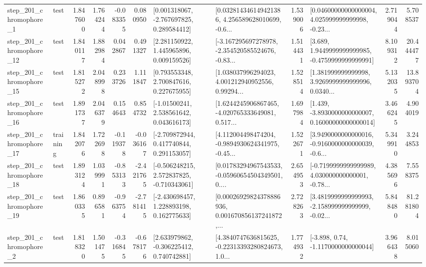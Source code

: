 \begin{tabular}{llrrrrllrlrr}
   step\_201\_chromophore\_1 &      test &      1.847600 &    1.764244 &     -0.083355 &  0.080950 &    [0.001318067, -2.767697825, 0.289584412] &  [0.032814346149421386, 4.256589628010699, -0.6... &       1.539006 &  [0.04600000000000004, 4.025999999999998, -0.23... &            2.719044 &          5.708537 \\
  step\_201\_chromophore\_12 &      test &      1.840117 &    1.882984 &      0.042867 &  0.491327 &     [2.281150922, 1.445965896, 0.009159526] &  [-3.167295697278978, -2.354520585524676, -0.83... &       1.514431 &   [3.689, 1.9449999999999985, -0.4759999999999991] &            8.109312 &         20.444477 \\
  step\_201\_chromophore\_15 &      test &      1.815272 &    2.048998 &      0.233726 &  1.111847 &     [0.793553348, 2.700847616, 0.227675955] &  [1.038037996294023, 4.001212940952556, 0.99294... &       1.528514 &  [1.381999999999998, 3.9269999999999996, 0.0340... &            5.132035 &         13.893704 \\
  step\_201\_chromophore\_16 &      test &      1.891737 &    2.046379 &      0.154643 &  0.854732 &     [-1.01500241, 2.538561642, 0.043616173] &  [1.6244245906867465, -4.020765333649081, 0.517... &       1.697984 &  [1.439, -3.8930000000000007, 0.16000000000000014] &            3.466245 &          4.904019 \\
  step\_201\_chromophore\_17 &  training &      1.842076 &    1.722698 &     -0.119378 & -0.036167 &    [-2.709872944, 0.417740844, 0.291153057] &  [4.112004498474204, -0.9894930624341975, -0.45... &       1.522671 &  [3.9490000000000016, -0.9160000000000039, -0.6... &            5.349910 &          3.244853 \\
  step\_201\_chromophore\_18 &      test &      1.893124 &    1.039991 &     -0.853133 & -2.421765 &   [-0.506248215, 2.572837825, -0.710343061] &  [0.01783294967543533, -0.05960654504349501, 0.... &       2.654953 &  [-0.7199999999999989, 4.030000000000001, -0.78... &            4.385696 &          7.558375 \\
  step\_201\_chromophore\_19 &      test &      1.860335 &    0.896581 &     -0.963754 & -2.781415 &    [-2.430698457, 1.228893198, 0.162775633] &  [0.00026929824378886936, 0.001670856137241872,... &       2.728263 &  [3.4819999999999993, -2.158999999999999, -0.02... &            5.848480 &         81.281804 \\
   step\_201\_chromophore\_2 &      test &      1.818320 &    1.501475 &     -0.316845 & -0.678176 &    [2.633979862, -0.306225412, 0.740742881] &  [4.3840747636815625, -0.22313393280824673, 1.0... &       1.774932 &                [-3.898, 0.74, -1.1170000000000044] &            3.966438 &          8.015060 \\

\end{tabular}
